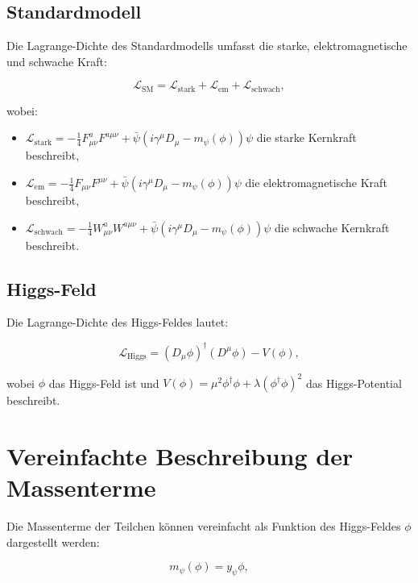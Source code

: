 \documentclass{article}
\begin{document}
\subsection{Standardmodell}
Die Lagrange-Dichte des Standardmodells umfasst die starke, elektromagnetische und schwache Kraft:

\begin{equation}
	\mathcal{L}_\text{SM} = \mathcal{L}_\text{stark} + \mathcal{L}_\text{em} + \mathcal{L}_\text{schwach},
\end{equation}

wobei:
\begin{itemize}
	\item $\mathcal{L}_\text{stark} = -\frac{1}{4} F_{\mu\nu}^a F^{a\mu\nu} + \bar{\psi}(i \gamma^\mu D_\mu - m_\psi(\phi))\psi$ die starke Kernkraft beschreibt,
	\item $\mathcal{L}_\text{em} = -\frac{1}{4} F_{\mu\nu} F^{\mu\nu} + \bar{\psi}(i \gamma^\mu D_\mu - m_\psi(\phi))\psi$ die elektromagnetische Kraft beschreibt,
	\item $\mathcal{L}_\text{schwach} = -\frac{1}{4} W_{\mu\nu}^a W^{a\mu\nu} + \bar{\psi}(i \gamma^\mu D_\mu - m_\psi(\phi))\psi$ die schwache Kernkraft beschreibt.
\end{itemize}

\subsection{Higgs-Feld}
Die Lagrange-Dichte des Higgs-Feldes lautet:

\begin{equation}
	\mathcal{L}_\text{Higgs} = (D_\mu \phi)^\dagger (D^\mu \phi) - V(\phi),
\end{equation}

wobei $\phi$ das Higgs-Feld ist und $V(\phi) = \mu^2 \phi^\dagger \phi + \lambda (\phi^\dagger \phi)^2$ das Higgs-Potential beschreibt.

\section{Vereinfachte Beschreibung der Massenterme}

Die Massenterme der Teilchen können vereinfacht als Funktion des Higgs-Feldes $\phi$ dargestellt werden:

\begin{equation}
	m_\psi(\phi) = y_\psi \phi,
\end{equation}
\end{document}
